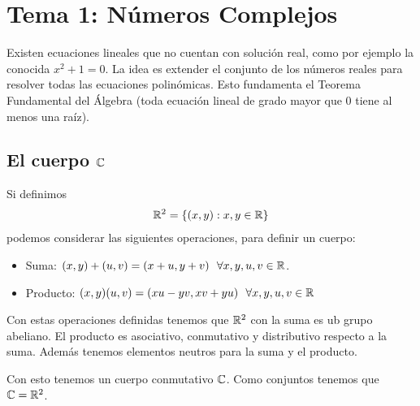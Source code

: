 \chapter{Tema 1: Números Complejos}

Existen ecuaciones lineales que no cuentan con solución real, como por ejemplo la conocida $x^2+1=0$. La idea es extender el conjunto de los números reales para resolver todas las ecuaciones polinómicas. Esto fundamenta el Teorema Fundamental del Álgebra (toda ecuación lineal de grado mayor que 0 tiene al menos una raíz).

\section{El cuerpo $\mathbb{C}$}

Si definimos 
\begin{align*}
    \mathbb{R}^2= \{(x,y): x,y \in \mathbb{R}\}
\end{align*}
podemos considerar las siguientes operaciones, para definir un cuerpo:
\begin{itemize}
    \item Suma: $(x,y) + (u,v) = (x+u, y+v)\ \ \forall x,y,u,v\in \bb{R}$.
    \item Producto: $(x,y)(u,v) = (xu - yv, xv + yu) \ \ \forall x,y,u,v \in \mathbb{R}$
\end{itemize}

Con estas operaciones definidas tenemos que $\mathbb{R}^2$ con la suma es ub grupo abeliano. El producto es asociativo, conmutativo y distributivo respecto a la suma. 
Además tenemos elementos neutros para la suma y el producto.

Con esto tenemos un cuerpo conmutativo $\mathbb{C}$. Como conjuntos tenemos que $\mathbb{C}=\mathbb{R}^2$.